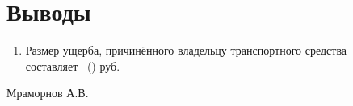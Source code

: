 \section{Выводы}
%
%
\begin{enumerate}
\item Размер ущерба, причинённого владельцу  транспортного средства \tc\,\- \,  составляет \, () руб.%
\end{enumerate}
\vspace{8mm}
      \hfill                        {Мраморнов А.В.}
\vspace{6mm}
\relax

